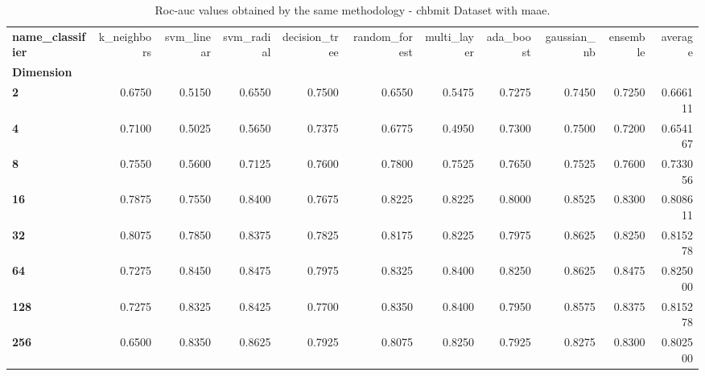 \begin{table}
\centering
\caption{Roc-auc values obtained by the same methodology - chbmit Dataset with maae.}
\label{roc-auc_chbmit_maae-reproduction}
\begin{tabular}{lrrrrrrrrrr}
\toprule
\textbf{name\_classifier} &  k\_neighbors &  svm\_linear &  svm\_radial &  decision\_tree &  random\_forest &  multi\_layer &  ada\_boost &  gaussian\_nb &  ensemble &   average \\
\textbf{Dimension} &              &             &             &                &                &              &            &              &           &           \\
\midrule
\textbf{2        } &       0.6750 &      0.5150 &      0.6550 &         0.7500 &         0.6550 &       0.5475 &     0.7275 &       0.7450 &    0.7250 &  0.666111 \\
\textbf{4        } &       0.7100 &      0.5025 &      0.5650 &         0.7375 &         0.6775 &       0.4950 &     0.7300 &       0.7500 &    0.7200 &  0.654167 \\
\textbf{8        } &       0.7550 &      0.5600 &      0.7125 &         0.7600 &         0.7800 &       0.7525 &     0.7650 &       0.7525 &    0.7600 &  0.733056 \\
\textbf{16       } &       0.7875 &      0.7550 &      0.8400 &         0.7675 &         0.8225 &       0.8225 &     0.8000 &       0.8525 &    0.8300 &  0.808611 \\
\textbf{32       } &       0.8075 &      0.7850 &      0.8375 &         0.7825 &         0.8175 &       0.8225 &     0.7975 &       0.8625 &    0.8250 &  0.815278 \\
\textbf{64       } &       0.7275 &      0.8450 &      0.8475 &         0.7975 &         0.8325 &       0.8400 &     0.8250 &       0.8625 &    0.8475 &  0.825000 \\
\textbf{128      } &       0.7275 &      0.8325 &      0.8425 &         0.7700 &         0.8350 &       0.8400 &     0.7950 &       0.8575 &    0.8375 &  0.815278 \\
\textbf{256      } &       0.6500 &      0.8350 &      0.8625 &         0.7925 &         0.8075 &       0.8250 &     0.7925 &       0.8275 &    0.8300 &  0.802500 \\
\bottomrule
\end{tabular}
\end{table}
